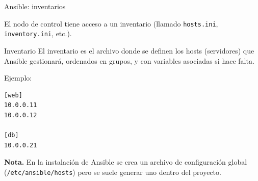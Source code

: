 \documentclass{beamer}
\begin{document}
\begin{frame}[fragile]{Ansible: inventarios}

El nodo de control tiene acceso a un inventario (llamado \texttt{hosts.ini}, \texttt{inventory.ini}, etc.). 

\begin{block}{Inventario}
El inventario es el archivo donde se definen los hosts (servidores) que Ansible gestionará, ordenados en grupos, y con variables asociadas si hace falta.
\end{block}

Ejemplo:

\begin{verbatim}
[web]
10.0.0.11
10.0.0.12

[db]
10.0.0.21
\end{verbatim}

\textbf{Nota.} En la instalación de Ansible se crea un archivo de configuración global (\texttt{/etc/ansible/hosts}) pero se suele generar uno dentro del proyecto.
    
\end{frame}
\end{document}
